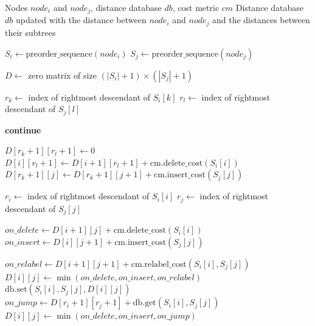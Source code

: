 \begin{algorithm}
\caption{Tree edit distance}\label{alg:ted}
\begin{algorithmic}[1]
\Require Nodes $node_i$ and $node_j$, distance database $db$, cost metric $cm$
\Ensure Distance database $db$ updated with the distance between $node_i$ and $node_j$ and the distances between their subtrees

\State $S_i \gets \text{preorder\_sequence}(node_i)$
\State $S_j \gets \text{preorder\_sequence}(node_j)$

\State $D \gets$ zero matrix of size $(|S_i| + 1) \times (|S_j| + 1)$

    \State $r_k \gets$ index of rightmost descendant of $S_i[k]$
        \State $r_l \gets$ index of rightmost descendant of $S_j[l]$

            \State \textbf{continue}
        \EndIf
        
        \State $D[r_k + 1][r_l + 1] \gets 0$
            \State $D[i][r_l + 1] \gets D[i + 1][r_l + 1] + \text{cm.delete\_cost}(S_i[i])$
        \EndFor
            \State $D[r_k + 1][j] \gets D[r_k + 1][j + 1] + \text{cm.insert\_cost}(S_j[j])$
        \EndFor
        
            \State $r_i \gets$ index of rightmost descendant of $S_i[i]$
                \State $r_j \gets$ index of rightmost descendant of $S_j[j]$
                
                \State $on\_delete \gets D[i + 1][j] + \text{cm.delete\_cost}(S_i[i])$
                \State $on\_insert \gets D[i][j + 1] + \text{cm.insert\_cost}(S_j[j])$
                
                    \State $on\_relabel \gets D[i + 1][j + 1] + \text{cm.relabel\_cost}(S_i[i], S_j[j])$
                    \State $D[i][j] \gets \min(on\_delete, on\_insert, on\_relabel)$
                    \State $\text{db.set}(S_i[i], S_j[j], D[i][j])$
                \Else
                    \State $on\_jump \gets D[r_i + 1][r_j + 1] + \text{db.get}(S_i[i], S_j[j])$
                    \State $D[i][j] \gets \min(on\_delete, on\_insert, on\_jump)$
                \EndIf
            \EndFor
        \EndFor
    \EndFor
\EndFor

\end{algorithmic}
\end{algorithm}

